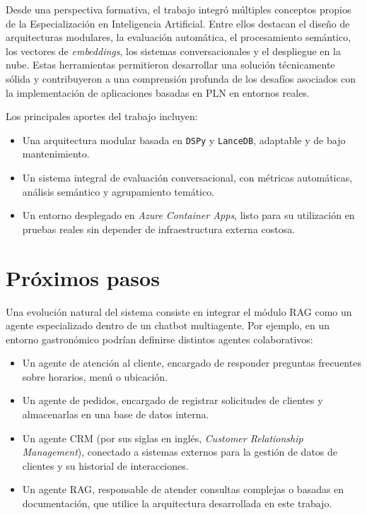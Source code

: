 Desde una perspectiva formativa, el trabajo integró múltiples conceptos propios de la Especialización en Inteligencia Artificial. Entre ellos destacan el diseño de arquitecturas modulares, la evaluación automática, el procesamiento semántico, los vectores de \textit{embeddings}, los sistemas conversacionales y el despliegue en la nube. Estas herramientas permitieron desarrollar una solución técnicamente sólida y contribuyeron a una comprensión profunda de los desafíos asociados con la implementación de aplicaciones basadas en PLN en entornos reales.

Los principales aportes del trabajo incluyen:

\begin{itemize}
\item Una arquitectura modular basada en \texttt{DSPy} y \texttt{LanceDB}, adaptable y de bajo mantenimiento.
\item Un sistema integral de evaluación conversacional, con métricas automáticas, análisis semántico y agrupamiento temático.
\item Un entorno desplegado en \textit{Azure Container Apps}, listo para su utilización en pruebas reales sin depender de infraestructura externa costosa.
\end{itemize}

\section{Próximos pasos}

Una evolución natural del sistema consiste en integrar el módulo RAG como un agente especializado dentro de un chatbot multiagente. Por ejemplo, en un entorno gastronómico podrían definirse distintos agentes colaborativos:

\begin{itemize}
\item Un agente de atención al cliente, encargado de responder preguntas frecuentes sobre horarios, menú o ubicación.
\item Un agente de pedidos, encargado de registrar solicitudes de clientes y almacenarlas en una base de datos interna.
\item Un agente CRM (por sus siglas en inglés, \textit{Customer Relationship Management}), conectado a sistemas externos para la gestión de datos de clientes y su historial de interacciones.
\item Un agente RAG, responsable de atender consultas complejas o basadas en documentación, que utilice la arquitectura desarrollada en este trabajo.
\end{itemize}

